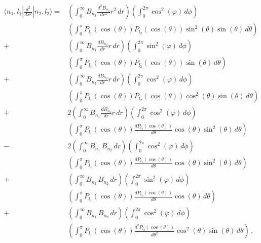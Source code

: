 \documentclass[12pt,a4paper]{article}
\newcommand{\ddx}[1]{\frac{d^2{#1}}{dx^2}}
\newcommand{\dr}[1]{\frac{d{#1}}{dr}}
\newcommand{\ddr}[1]{\frac{d^2{#1}}{dr^2}}
\newcommand{\dt}[1]{\frac{d{#1}}{d\theta}}
\newcommand{\ddt}[1]{\frac{d^2{#1}}{d\theta^2}}
\newcommand{\ccphi}{\cos^2(\varphi)}
\newcommand{\ssphi}{\sin^2(\varphi)}
\newcommand{\ct}{\cos(\theta)}
\newcommand{\cct}{\cos^2(\theta)}
\newcommand{\st}{\sin(\theta)}
\newcommand{\sst}{\sin^2(\theta)}
\begin{document}
\begin{equation}
\begin{split}
\langle n_1,l_1|\ddx{}|n_2,l_2\rangle =& \left(\int_0^{\infty} B_{n_1} \ddr{B_{n_2}}r^2\,dr\right)
                                         \left(\int_0^{2\pi} \ccphi\,d\phi\right) \\
                                       & \left(\int_0^{\pi} P_{l_1}(\ct)P_{l_2}(\ct)\sst\st\,d\theta\right) \\
                                      +& \left(\int_0^{\infty} B_{n_1} \dr{B_{n_2}}r\,dr\right)
                                         \left(\int_0^{2\pi} \ssphi\,d\phi\right) \\
                                       & \left(\int_0^{\pi} P_{l_1}(\ct)P_{l_2}(\ct)\st\,d\theta\right) \\
                                      +& \left(\int_0^{\infty} B_{n_1} \dr{B_{n_2}}r\,dr\right)
                                         \left(\int_0^{2\pi} \ccphi\,d\phi\right) \\
                                       & \left(\int_0^{\pi} P_{l_1}(\ct)P_{l_2}(\ct)\cct\st\,d\theta\right) \\
                                      +&2\left(\int_0^{\infty} B_{n_1} \dr{B_{n_2}}r\,dr\right)
                                         \left(\int_0^{2\pi} \ccphi\,d\phi\right) \\
                                       & \left(\int_0^{\pi} P_{l_1}(\ct)\dt{P_{l_2}(\ct)}\ct\sst\,d\theta\right) \\
                                      -&2\left(\int_0^{\infty} B_{n_1}\,B_{n_2}\,dr\right)
                                         \left(\int_0^{2\pi} \ccphi\,d\phi\right) \\
                                       & \left(\int_0^{\pi} P_{l_1}(\ct)\dt{P_{l_2}(\ct)}\ct\sst\,d\theta\right) \\
                                      +& \left(\int_0^{\infty} B_{n_1}\,B_{n_2}\,dr\right)
                                         \left(\int_0^{2\pi} \ssphi\,d\phi\right) \\
                                       & \left(\int_0^{\pi} P_{l_1}(\ct)\dt{P_{l_2}(\ct)}\ct\,d\theta\right) \\
                                      +& \left(\int_0^{\infty} B_{n_1}\,B_{n_2}\,dr\right)
                                         \left(\int_0^{2\pi} \ccphi\,d\phi\right) \\
                                       & \left(\int_0^{\pi} P_{l_1}(\ct)\ddt{P_{l_2}(\ct)}\cct\st\,d\theta\right)\,. \\
\end{split}
\end{equation}
\end{document}
